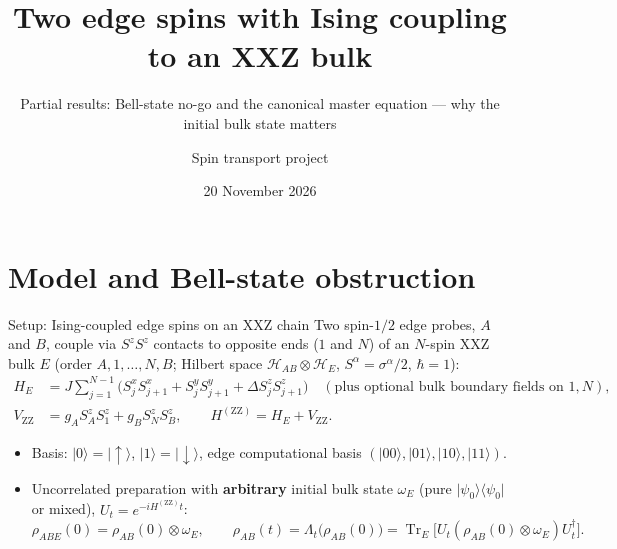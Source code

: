 \documentclass[aspectratio=169,11pt]{beamer}
\title{Two edge spins with Ising coupling to an XXZ bulk}
\subtitle{Partial results: Bell-state no-go and the canonical master equation --- why the initial bulk state matters}
\author{Spin transport project}
\date{20 November 2026}
\newcommand{\ket}[1]{\lvert #1\rangle}
\newcommand{\bra}[1]{\langle #1\rvert}
\newcommand{\Tr}{\operatorname{Tr}}
\newcommand{\ZZ}{\mathrm{ZZ}}
\begin{document}
\begin{frame}[plain]
\titlepage
\end{frame}

\section{Model and Bell-state obstruction}

\begin{frame}{Setup: Ising-coupled edge spins on an XXZ chain}
\small
Two spin-$1/2$ edge probes, $A$ and $B$, couple via $S^z S^z$ contacts to opposite ends ($1$ and $N$) of an $N$-spin XXZ bulk $E$ (order $A,1,\ldots,N,B$; Hilbert space $\mathcal H_{AB}\otimes\mathcal H_E$, $S^\alpha=\sigma^\alpha/2$, $\hbar=1$):
\begin{align*}
H_E&=J\sum_{j=1}^{N-1}\bigl(S_j^xS_{j+1}^x+S_j^yS_{j+1}^y+\Delta S_j^zS_{j+1}^z\bigr)\quad(\text{plus optional bulk boundary fields on }1,N),\\[-2pt]
V_{\ZZ}&=g_A S_A^zS_1^z+g_B S_N^zS_B^z,\qquad H^{(\ZZ)}=H_E+V_{\ZZ}.
\end{align*}
\begin{itemize}\setlength\itemsep{4pt}
\item Basis: $\ket0=\ket\uparrow$, $\ket1=\ket\downarrow$, edge computational basis $(\ket{00},\ket{01},\ket{10},\ket{11})$.
\item Uncorrelated preparation with \textbf{arbitrary} initial bulk state $\omega_E$ (pure $\ket{\psi_0}\bra{\psi_0}$ or mixed), $U_t=e^{-iH^{(\ZZ)}t}$:
\[
\rho_{ABE}(0)=\rho_{AB}(0)\otimes\omega_E,\qquad
\rho_{AB}(t)=\Lambda_t\bigl(\rho_{AB}(0)\bigr)=\Tr_E\bigl[U_t(\rho_{AB}(0)\otimes\omega_E)U_t^\dagger\bigr].
\]

\end{itemize}
\end{frame}
\end{document}

